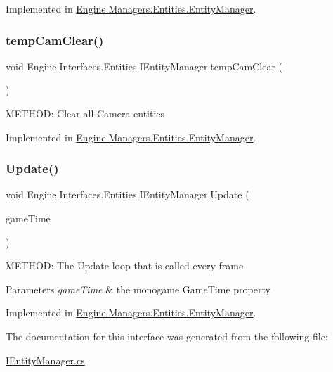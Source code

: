 Implemented in \hyperlink{a00518_a1d9ffc3b80cc8633265fe1f7e51c6122}{Engine.\+Managers.\+Entities.\+Entity\+Manager}.

\mbox{\label{a00442_a04101871e7eef6b222a0cbd6225d0a7a}} 
\subsubsection{\texorpdfstring{temp\+Cam\+Clear()}{tempCamClear()}}
{\footnotesize\ttfamily void Engine.\+Interfaces.\+Entities.\+I\+Entity\+Manager.\+temp\+Cam\+Clear (\begin{DoxyParamCaption}{ }\end{DoxyParamCaption})}



M\+E\+T\+H\+OD\+: Clear all Camera entities 



Implemented in \hyperlink{a00518_a960c2ec6b45bbbd4f0030b04f90dc407}{Engine.\+Managers.\+Entities.\+Entity\+Manager}.

\mbox{\label{a00442_a1b5aeaf8f2f6ad4a0c93aec1c331c1b2}} 
\subsubsection{\texorpdfstring{Update()}{Update()}}
{\footnotesize\ttfamily void Engine.\+Interfaces.\+Entities.\+I\+Entity\+Manager.\+Update (\begin{DoxyParamCaption}\item[{Game\+Time}]{game\+Time }\end{DoxyParamCaption})}



M\+E\+T\+H\+OD\+: The Update loop that is called every frame 


\begin{DoxyParams}{Parameters}
{\em game\+Time} & the monogame Game\+Time property\\
\hline
\end{DoxyParams}


Implemented in \hyperlink{a00518_a386e96f9edb12689118de624c559de0f}{Engine.\+Managers.\+Entities.\+Entity\+Manager}.



The documentation for this interface was generated from the following file\+:\begin{DoxyCompactItemize}
\item 
\hyperlink{a00113}{I\+Entity\+Manager.\+cs}\end{DoxyCompactItemize}
